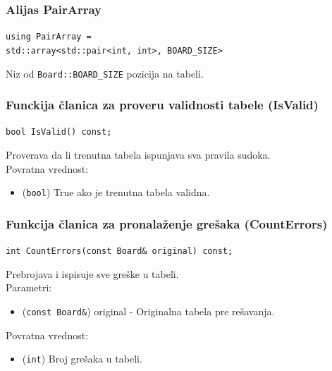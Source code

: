 \documentclass[a4paper]{article}
\begin{document}
    \subsubsection{Alijas PairArray}
    \texttt{using PairArray = }\\ 
    \texttt{std::array<std::pair<int, int>, BOARD\_SIZE>}
    \par Niz od \texttt{Board::BOARD\_SIZE} pozicija na tabeli.

    \subsubsection{Funckija članica za proveru validnosti tabele (IsValid)}
    \texttt{bool IsValid() const;}
    \par Proverava da li trenutna tabela ispunjava sva pravila sudoka.\\
    Povratna vrednost:
    \begin{itemize}
        \item (\texttt{bool}) True ako je trenutna tabela validna.
    \end{itemize}

    \subsubsection{Funkcija članica za pronalaženje grešaka (CountErrors)}
    \texttt{int CountErrors(const Board\& original) const;}
    \par Prebrojava i ispisuje sve greške u tabeli.\\
    Parametri:
    \begin{itemize}
        \item (\texttt{const Board\&}) original - Originalna tabela pre rešavanja.
    \end{itemize}
    Povratna vrednost:
    \begin{itemize}
        \item (\texttt{int}) Broj grešaka u tabeli.
    \end{itemize}
\end{document}
